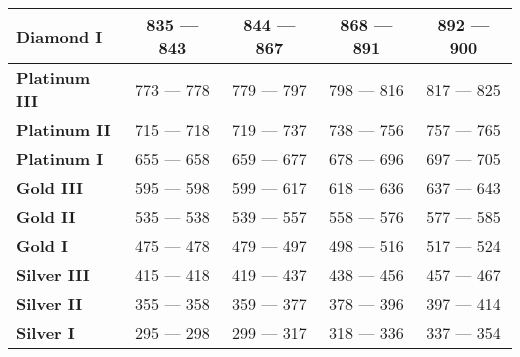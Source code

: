 \begin{table}[]
\begin{tabular}{|l|c|c|c|c|}
    \textbf{Diamond I}            & 835 — 843                                & 844 — 867                                 & 868 — 891                                  & 892 — 900                                 \\ \hline
    \textbf{Platinum III}         & 773 — 778                                & 779 — 797                                 & 798 — 816                                  & 817 — 825                                 \\ \hline
    \textbf{Platinum II}          & 715 — 718                                & 719 — 737                                 & 738 — 756                                  & 757 — 765                                 \\ \hline
    \textbf{Platinum I}           & 655 — 658                                & 659 — 677                                 & 678 — 696                                  & 697 — 705                                 \\ \hline
    \textbf{Gold III}             & 595 — 598                                & 599 — 617                                 & 618 — 636                                  & 637 — 643                                 \\ \hline
    \textbf{Gold II}              & 535 — 538                                & 539 — 557                                 & 558 — 576                                  & 577 — 585                                 \\ \hline
    \textbf{Gold I}               & 475 — 478                                & 479 — 497                                 & 498 — 516                                  & 517 — 524                                 \\ \hline
    \textbf{Silver III}           & 415 — 418                                & 419 — 437                                 & 438 — 456                                  & 457 — 467                                 \\ \hline
    \textbf{Silver II}            & 355 — 358                                & 359 — 377                                 & 378 — 396                                  & 397 — 414                                 \\ \hline
    \textbf{Silver I}             & 295 — 298                                & 299 — 317                                 & 318 — 336                                  & 337 — 354                                 \\ \hline

\end{tabular}
\end{table}
